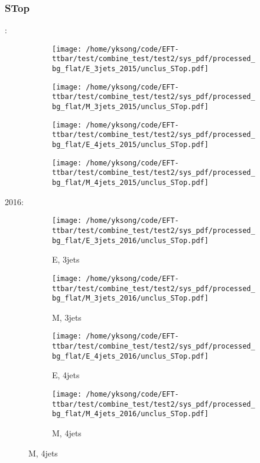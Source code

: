 \documentclass{beamer}
\begin{document}
\begin{frame}
\frametitle{STop}
\fontsize{5}{1}:
\begin{figure}
\centering
\begin{subfigure}[b]{0.24\textwidth}
\texttt{[image: /home/yksong/code/EFT-ttbar/test/combine\_test/test2/sys\_pdf/processed\_bg\_flat/E\_3jets\_2015/unclus\_STop.pdf]}
\end{subfigure}
\begin{subfigure}[b]{0.24\textwidth}
\texttt{[image: /home/yksong/code/EFT-ttbar/test/combine\_test/test2/sys\_pdf/processed\_bg\_flat/M\_3jets\_2015/unclus\_STop.pdf]}
\end{subfigure}
\begin{subfigure}[b]{0.24\textwidth}
\texttt{[image: /home/yksong/code/EFT-ttbar/test/combine\_test/test2/sys\_pdf/processed\_bg\_flat/E\_4jets\_2015/unclus\_STop.pdf]}
\end{subfigure}
\begin{subfigure}[b]{0.24\textwidth}
\texttt{[image: /home/yksong/code/EFT-ttbar/test/combine\_test/test2/sys\_pdf/processed\_bg\_flat/M\_4jets\_2015/unclus\_STop.pdf]}
\end{subfigure}
\end{figure}
2016:
\begin{figure}
\centering
\begin{subfigure}[b]{0.24\textwidth}
\texttt{[image: /home/yksong/code/EFT-ttbar/test/combine\_test/test2/sys\_pdf/processed\_bg\_flat/E\_3jets\_2016/unclus\_STop.pdf]}
\captionsetup{font=tiny}
\caption{E, 3jets}
\end{subfigure}
\begin{subfigure}[b]{0.24\textwidth}
\texttt{[image: /home/yksong/code/EFT-ttbar/test/combine\_test/test2/sys\_pdf/processed\_bg\_flat/M\_3jets\_2016/unclus\_STop.pdf]}
\captionsetup{font=tiny}
\caption{M, 3jets}
\end{subfigure}
\begin{subfigure}[b]{0.24\textwidth}
\texttt{[image: /home/yksong/code/EFT-ttbar/test/combine\_test/test2/sys\_pdf/processed\_bg\_flat/E\_4jets\_2016/unclus\_STop.pdf]}
\captionsetup{font=tiny}
\caption{E, 4jets}
\end{subfigure}
\begin{subfigure}[b]{0.24\textwidth}
\texttt{[image: /home/yksong/code/EFT-ttbar/test/combine\_test/test2/sys\_pdf/processed\_bg\_flat/M\_4jets\_2016/unclus\_STop.pdf]}
\captionsetup{font=tiny}
\caption{M, 4jets}
\end{subfigure}
\end{figure}
\end{frame}
\end{document}
